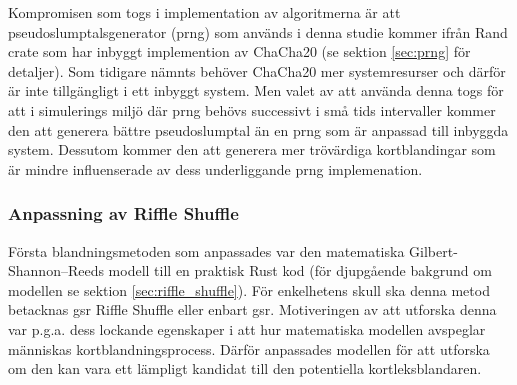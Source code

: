 \documentclass[swedish,a4paper]{article}
\begin{document}
Kompromisen som togs i implementation av algoritmerna är att
pseudoslumptalsgenerator (\gls{prng}) som används i denna studie kommer ifrån
Rand \gls{crate} som har inbyggt implemention av ChaCha20 (se sektion
\ref{sec:prng} för detaljer). Som tidigare nämnts behöver ChaCha20 mer
systemresurser och därför är inte tillgängligt i ett inbyggt system. Men
valet av att använda denna togs för att i simulerings miljö där \gls{prng} behövs
successivt i små tids intervaller kommer den att generera bättre pseudoslumptal
än en \gls{prng} som är anpassad till inbyggda system. Dessutom kommer den att
generera mer trövärdiga kortblandingar som är mindre influenserade av dess
underliggande \gls{prng} implemenation. 

\subsubsection{Anpassning av Riffle Shuffle}

 

Första blandningsmetoden som anpassades var den matematiska
Gilbert-Shannon–Reeds modell till en praktisk Rust kod (för djupgående bakgrund
om modellen se sektion \ref{sec:riffle_shuffle}). För enkelhetens skull ska denna metod
betacknas \gls{gsr} Riffle Shuffle eller enbart \gls{gsr}. Motiveringen av att
utforska denna var  p.g.a. dess lockande egenskaper i att hur matematiska
modellen avspeglar människas kortblandningsprocess. Därför anpassades modellen för att
utforska om den kan vara ett lämpligt kandidat till den potentiella
kortleksblandaren.
\end{document}

